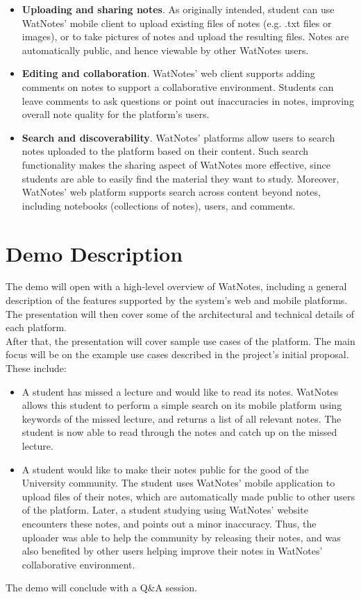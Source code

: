 \documentclass[12pt]{article}
\begin{document}
    \begin{itemize}
      \item
        \textbf{Uploading and sharing notes}. As originally intended, student can use WatNotes' mobile client to upload existing
        files of notes (e.g. .txt files or images), or to take pictures of notes and upload the resulting files. Notes are
        automatically public, and hence viewable by other WatNotes users.
      \item
        \textbf{Editing and collaboration}. WatNotes' web client supports adding comments on notes to support a collaborative environment.
        Students can leave comments to ask questions or point out inaccuracies in notes, improving overall note quality for
        the platform's users.
      \item
        \textbf{Search and discoverability}. WatNotes' platforms allow users to search notes uploaded to the platform based on their content.
        Such search functionality makes the sharing aspect of WatNotes more effective, since students are able to easily find the
        material they want to study. Moreover, WatNotes' web platform supports search across content beyond notes, including notebooks
        (collections of notes), users, and comments.
    \end{itemize}
  \newpage

  \section{Demo Description}
    The demo will open with a high-level overview of WatNotes, including a general description of the features supported by the system's web
    and mobile platforms. The presentation will then cover some of the architectural and technical details of each platform. \\
    
    After that, the presentation will cover sample use cases of the platform. The main focus will be on the example use cases
    described in the project's initial proposal. These include:

    \begin{itemize}
      \item
        A student has missed a lecture and would like to read its notes. WatNotes allows this student to perform a simple search on
        its mobile platform using keywords of the missed lecture, and returns a list of all relevant notes. The student is now able
        to read through the notes and catch up on the missed lecture.
      \item
        A student would like to make their notes public for the good of the University community. The student uses WatNotes' mobile
        application to upload files of their notes, which are automatically made public to other users of the platform. Later, a student
        studying using WatNotes' website encounters these notes, and points out a minor inaccuracy. Thus, the uploader was able to help
        the community by releasing their notes, and was also benefited by other users helping improve their notes in WatNotes' collaborative
        environment.
    \end{itemize}

    The demo will conclude with a Q\&A session.
\end{document}

